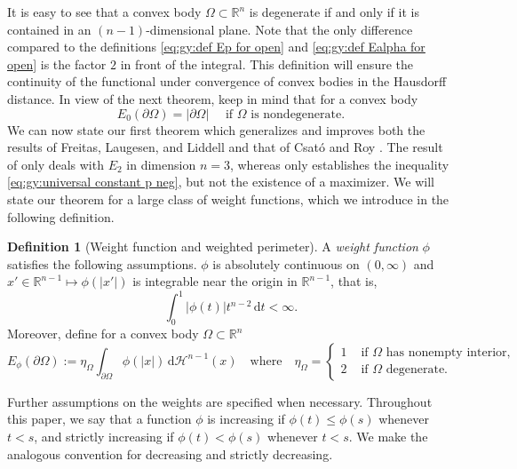 \documentclass[10pt,leqno]{amsart}
\newcommand{\R}[0]{\mathbb{R}}
\newcommand{\p}{\partial}
\newcommand{\dd}{\, \mathrm{d}}
\newcommand{\Hau}{\mathcal{H}}
\newcommand{\delomega}{\partial\Omega}
\numberwithin{Theorem}{section}
\theoremstyle{definition}
\newtheorem{Definition}[Theorem]{Definition}
\theoremstyle{remark}
\numberwithin{equation}{section}
\numberwithin{equation}{section}
\begin{document}
It is easy to see that a convex body $\Omega\subset\R^n$ is degenerate if and only if it is contained in an $(n-1)$-dimensional plane.
Note that the only difference compared to the definitions \eqref{eq:gy:def Ep for open} and \eqref{eq:gy:def Ealpha for open} is the factor $2$ in front of the integral. This definition will ensure the continuity of the functional under convergence of convex bodies in the  Hausdorff distance. In view of the next theorem, keep in mind that for a convex body
$$
  E_0(\partial\Omega)=|\partial\Omega|\quad\text{ if $\Omega$ is nondegenerate}.
$$
We can now state our first theorem which generalizes and improves both the results of Freitas, Laugesen, and Liddell
 \cite{FreitasLaugesenLiddell} and that of Csat\'o and Roy \cite{Csato2024}. The result of \cite[Theorem 1]{FreitasLaugesenLiddell} only deals with $E_2$ in dimension $n=3$, whereas \cite[Theorem 1.2]{Csato2024} only establishes the inequality \eqref{eq:gy:universal constant p neg}, but not the existence of a maximizer. 
We will state our theorem for a large class of weight functions, which we introduce in the following definition.
 
\begin{Definition}[Weight function and weighted perimeter]\label{intro:gy:weight function} A \textit{weight function} $\phi$  satisfies the following assumptions.  $\phi$ is absolutely continuous on $(0,\infty)$ and $x' \in \R^{n-1} \mapsto \phi(|x'|) $ is integrable near the origin in $\R^{n-1}$, that is,
\begin{equation}\label{eq:integrability_phi}
\int_0^{1} |\phi(t)| t^{n-2} \dd t < \infty.
\end{equation}
Moreover, define for a convex body $\Omega\subset \R^n$
$$
  E_{\phi}(\delomega):=\eta_{\Omega}\int_{\p\Omega}\phi(|x|)
  \dd \Hau^{n-1}(x)\quad\text{where}\quad
  \eta_{\Omega}= \left\{\begin{array}{rl}
    1 & \text{ if $\Omega$ has nonempty interior,}
    \\
    2 & \text{ if $\Omega$ degenerate.}
  \end{array}\right.
$$
\end{Definition}

Further assumptions on the weights are specified when necessary.
Throughout this paper, we say that a function $\phi$ is increasing if $\phi(t) \leq \phi(s)$ whenever $t < s$, and strictly increasing if $\phi(t) < \phi(s)$ whenever $t < s$. We make the analogous convention for decreasing and strictly decreasing. 
\end{document}
